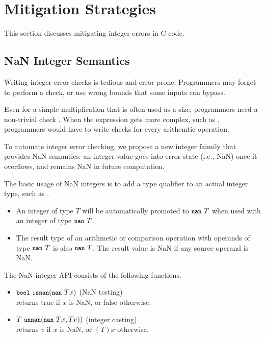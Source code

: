 \section{Mitigation Strategies}
\label{s:miti}

This section discusses mitigating integer errors
in C code.

\subsection{NaN Integer Semantics}

Writing integer error checks is tedious and error-prone.  Programmers
may forget to perform a check, or use wrong bounds that some inputs
can bypass. 

Even for a simple multiplication  that is often used
as a  size, programmers need a non-trivial check .  When the expression gets more complex,
such as , programmers would have to write checks for
every arithemtic operation.


To automate integer error checking, we propose a new
integer faimily that provides NaN semantics: an integer value goes
into error state (i.e., NaN) once it overflows, and remains NaN in
future computation.

The basic usage of NaN integers is to add a type qualifier 
to an actual integer type, such as .
\begin{itemize}
\item
An integer of type $T$ will be automatically promoted to $\cc{nan}\ T$
when used with an integer of type $\cc{nan}\ T$.
\item
The result type of an arithmetic or comparison operation with
operands of type $\cc{nan}\ T$ is also $\cc{nan}\ T$.
The result value is NaN if any source operand is NaN.
\end{itemize}

The NaN integer API consists of the following functions.
\begin{itemize}
\item
$\cc{bool}\ \cc{isnan}(\cc{nan}\ T x)$ \hfill (NaN testing) \\
returns true if $x$ is NaN, or false otherwise.
\item
$T\ \cc{unnan}(\cc{nan}\ T x, T v))$ \hfill (integer casting) \\
returns $v$ if $x$ is NaN, or $(T)x$ otherwise.
\end{itemize}

